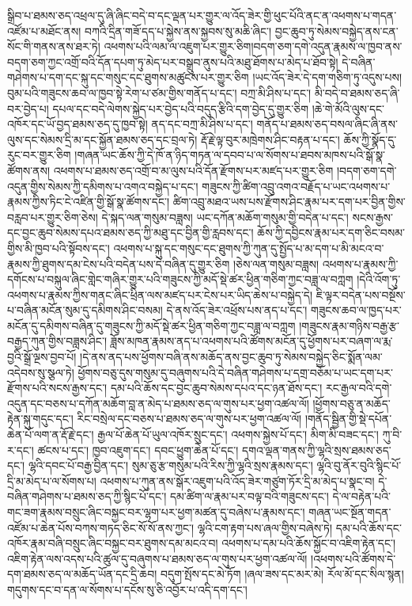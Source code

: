སྒྲིབ་པ་ཐམས་ཅད་འཕྲལ་དུ་ཞི་ཞིང་བདེ་བ་དང་ལྡན་པར་གྱུར་ལ་འོད་ཟེར་གྱི་ཕུང་པོའི་ནང་ན་འཕགས་པ་གདན་འཛོམ་པ་མཐོང་ནས། བཀའི་དྲིན་གཟོ་དད་པ་སྐྱེས་ནས་སྐྱབས་སུ་མཆི་ཞིང་། བྱང་ཆུབ་ཏུ་སེམས་བསྐྱེད་ནས་ངན་སོང་གི་གནས་ནས་ཐར་ཏེ། འཕགས་པའི་ལམ་ལ་འཇུག་པར་གྱུར་ཅིག།བདག་ཅག་དགེ་འདུན་རྣམས་ལ་ཁྱབ་ནས་བདག་ཅག་ཀྱང་འགྲོ་བའི་དོན་དཔག་ཏུ་མེད་པར་བསྒྲུབ་ནུས་པའི་མཐུ་ཐོགས་པ་མེད་པ་ཐོབ་སྟེ། དེ་བཞིན་གཤེགས་པ་དག་དང་སྐུ་དང་གསུང་དང་ཐུགས་མཚུངས་པར་གྱུར་ཅིག །ཡང་འོད་ཟེར་དེ་དག་གཅིག་ཏུ་འདུས་པས། བུམ་པའི་གཟུངས་ཆབ་ལ་ཁྱབ་སྟེ་རེག་པ་ཙམ་གྱིས་གནོད་པ་དང་། བཀྲ་མི་ཤིས་པ་དང་། མི་བདེ་བ་ཐམས་ཅད་ཞི་བར་བྱེད་པ། དཔལ་དང་བདེ་ལེགས་སྐྱེད་པར་བྱེད་པའི་བདུད་རྩིའི་དག་བྱེད་དུ་གྱུར་ཅིག །ཆེ་གེ་མོའི་ལུས་དང་འཁོར་དང་ཡོ་བྱད་ཐམས་ཅད་དུ་ཁྱབ་སྟེ། ནད་དང་བཀྲ་མི་ཤིས་པ་དང་། གནོད་པ་ཐམས་ཅད་བསལ་ཞིང་ཞི་ནས་ལུས་དང་སེམས་དྲི་མ་དང་སྐྱོན་ཐམས་ཅད་དང་བྲལ་ཏེ། རྡོ་རྗེ་ལྟ་བུར་མཁྲེགས་ཤིང་བརྟན་པ་དང་། ཆོས་ཀྱི་སྣོད་དུ་རུང་བར་གྱུར་ཅིག །གཞན་ཡང་ཆོས་ཀྱི་དེ་ཁོ་ན་ཉིད་གཏན་ལ་དབབ་པ་ལ་སོགས་པ་ཐབས་མཁས་པའི་སྒོ་སྣ་ཚོགས་ནས། འཕགས་པ་ཐམས་ཅད་འགྲོ་བ་མ་ལུས་པའི་དོན་རྫོགས་པར་མཛད་པར་གྱུར་ཅིག །བདག་ཅག་དགེ་འདུན་གྱིས་སེམས་ཀྱི་དམིགས་པ་འགའ་བསྐྱེད་པ་དང་། གཟུངས་ཀྱི་ཚིག་འབྲུ་འགའ་བརྗོད་པ་ཡང་འཕགས་པ་རྣམས་ཀྱིས་ཏིང་ངེ་འཛིན་གྱི་སྒོ་སྣ་ཚོགས་དང་། ཚིག་འབྲུ་མཐའ་ཡས་པས་རྫོགས་ཤིང་རྣམ་པར་དག་པར་བྱིན་གྱིས་བརླབ་པར་གྱུར་ཅིག་ཅེས། དེ་སྐད་ལན་གསུམ་བཟླས། ཡང་དཀོན་མཆོག་གསུམ་གྱི་བདེན་པ་དང་། སངས་རྒྱས་དང་བྱང་ཆུབ་སེམས་དཔའ་ཐམས་ཅད་ཀྱི་མཐུ་དང་བྱིན་གྱི་རླབས་དང་། ཆོས་ཀྱི་དབྱིངས་རྣམ་པར་དག་ཅིང་བསམ་གྱིས་མི་ཁྱབ་པའི་སྟོབས་དང་། འཕགས་པ་སྐུ་དང་གསུང་དང་ཐུགས་ཀྱི་ཀུན་དུ་སྤྱོད་པ་མ་དག་པ་མི་མངའ་བ་རྣམས་ཀྱི་ཐུགས་དམ་ངེས་པའི་བདེན་པས་དེ་བཞིན་དུ་གྱུར་ཅིག །ཅེས་ལན་གསུམ་བཟླས། འཕགས་པ་རྣམས་ཀྱི་དགོངས་པ་བསྐུལ་ཞིང་གླེང་གཞིར་གྱུར་པའི་གཟུངས་ཀྱི་མདོ་སྡེ་ཚར་ཕྱིན་གཅིག་ཀྱང་བཟླ་ལ་བཀླག །དེའི་འོག་ཏུ་འཕགས་པ་རྣམས་ཀྱིས་གནང་ཞིང་ཕྲིན་ལས་མཛད་པར་ངེས་པར་ཡིད་ཆེས་པ་བསྐྱེད་དེ། ཇི་ལྟར་བདེན་པས་བསྔོས་པ་བཞིན་མངོན་སུམ་དུ་དམིགས་ཤིང་བསམ། དེ་ནས་འོད་ཟེར་འཕྲོས་པས་ནད་པ་དང་། གཟུངས་ཆབ་ལ་ཁྱད་པར་མངོན་དུ་དམིགས་བཞིན་དུ་གཟུངས་ཀྱི་མདོ་སྡེ་ཚར་ཕྱིན་གཅིག་ཀྱང་བཟླ་ལ་བཀླག །གཟུངས་རྣམ་གཉིས་བརྒྱ་རྩ་བརྒྱད་ཀུན་གྱིས་བཟླས་ཤིང་། ཟློས་མཁན་རྣམས་ནད་པ་འཕགས་པའི་ཚོགས་མངོན་དུ་ཕྱོགས་པར་བཞག་ལ་རྨ་བྱའི་སྒྲོ་ལྔས་བྱབ་པོ། །དེ་ནས་ནད་པས་ཕྱོགས་བཞི་ནས་མཆོད་ནས་བྱང་ཆུབ་ཏུ་སེམས་བསྐྱེད་ཅིང་སྨོན་ལམ་འདེབས་སུ་སྩལ་ཏེ། ཕྱོགས་བཅུ་དུས་གསུམ་དུ་བཞུགས་པའི་དེ་བཞིན་གཤེགས་པ་དགྲ་བཅོམ་པ་ཡང་དག་པར་རྫོགས་པའི་སངས་རྒྱས་དང་། དམ་པའི་ཆོས་དང་བྱང་ཆུབ་སེམས་དཔའ་དང་ཉན་ཐོས་དང་། རང་རྒྱལ་བའི་དགེ་འདུན་དང་བཅས་པ་དཀོན་མཆོག་བླ་ན་མེད་པ་ཐམས་ཅད་ལ་གུས་པར་ཕྱག་འཚལ་ལོ། །ཕྱོགས་བཅུ་ན་མཆོད་རྟེན་སྐུ་གདུང་དང་། རིང་བསྲེལ་དང་བཅས་པ་ཐམས་ཅད་ལ་གུས་པར་ཕྱག་འཚལ་ལོ། །གནོད་སྦྱིན་གྱི་སྡེ་དཔོན་ཆེན་པོ་ལག་ན་རྡོ་རྗེ་དང་། རྒྱལ་པོ་ཆེན་པོ་ཡུལ་འཁོར་སྲུང་དང་། འཕགས་སྐྱེས་པོ་དང་། མིག་མི་བཟང་དང་། ཀུ་བི་ར་དང་། ཚངས་པ་དང་། ཁྱབ་འཇུག་དང་། དབང་ཕྱུག་ཆེན་པོ་དང་། དགའ་ལྡན་གནས་ཀྱི་ལྷའི་སྲས་ཐམས་ཅད་དང་། ལྷའི་དབང་པོ་བརྒྱ་བྱིན་དང་། སུམ་ཅུ་རྩ་གསུམ་པའི་རིས་ཀྱི་ལྷའི་སྲས་རྣམས་དང་། ལྷའི་བུ་ནོར་བུའི་སྙིང་པོ་དྲི་མ་མེད་པ་ལ་སོགས་པ། འཕགས་པ་ཀུན་ནས་སྒོར་འཇུག་པའི་འོད་ཟེར་གཙུག་ཏོར་དྲི་མ་མེད་པ་སྣང་བ། དེ་བཞིན་གཤེགས་པ་ཐམས་ཅད་ཀྱི་སྙིང་པོ་དང་། དམ་ཚིག་ལ་རྣམ་པར་བལྟ་བའི་གཟུངས་དང་། དེ་ལ་བརྟེན་པའི་གང་ཟག་རྣམས་བསྲུང་ཞིང་བསྐྱང་བར་ལྷག་པར་ཕྱག་མཚན་དུ་བཞེས་པ་རྣམས་དང་། གཞན་ཡང་སྔོན་གདན་འཛོམ་པ་ཆེན་པོས་བཀས་གཏད་ཅིང་སོ་སོ་ནས་ཀྱང་། ལྷའི་ངག་རྟག་པས་ཞལ་གྱིས་བཞེས་ཏེ། དམ་པའི་ཆོས་དང་འཁོར་རྣམ་བཞི་བསྲུང་ཞིང་བསྐྱང་བར་ཐུགས་དམ་མངའ་བ། འཕགས་པ་དམ་པའི་ཆོས་སྐྱོང་བ་འཇིག་རྟེན་དང་། འཇིག་རྟེན་ལས་འདས་པའི་ཚུལ་དུ་བཞུགས་པ་ཐམས་ཅད་ལ་གུས་པར་ཕྱག་འཚལ་ལོ། །འཕགས་པའི་ཚོགས་དེ་དག་ཐམས་ཅད་ལ་མཆོད་ཡོན་དང་དྲི་ཆབ། བདུག་སྤོས་དང་མེ་ཏོག །ཞལ་ཟས་དང་མར་མེ། རོལ་མོ་དང་སིལ་སྙན། གདུགས་དང་བ་དན་ལ་སོགས་པ་དངོས་སུ་ཅི་འབྱོར་པ་འདི་དག་དང་། 